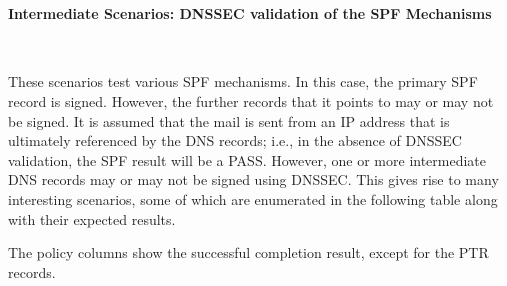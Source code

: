 \documentclass[12pt]{article}
\begin{document}

\paragraph{Intermediate Scenarios:  DNSSEC validation of the SPF Mechanisms \\}\verb" "

These scenarios test various SPF mechanisms.  In this case, the primary SPF
record is signed.  However, the further records that it points to may or may
not be signed.  It is assumed that the mail is sent from an IP address that
is ultimately referenced by the DNS records; i.e., in the absence of DNSSEC
validation, the SPF result will be a PASS.  However, one or more intermediate
DNS records may or may not be signed using DNSSEC.  This gives rise to many
interesting scenarios, some of which are enumerated in the following table
along with their expected results.

The policy columns show the successful completion result,
except for the PTR records.

\eject
\end{document}
